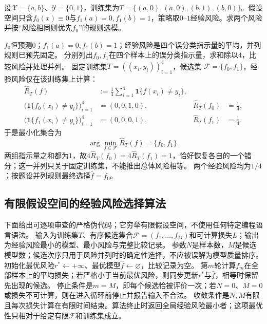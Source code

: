\begin{example}[两个候选分类规则的经验比较]\label{exm:V1-C09-finite-class}\label{schema:V1-C09:CH-18}\label{schema:V1-C09:CH-32}
设$\mathcal X=\{a,b\}$、$\mathcal Y=\{0,1\}$，训练集为$T=\{(a,0),(a,0),(b,1),(b,0)\}$。假设空间只含$f_0(x)\equiv0$与$f_1(a)=0,f_1(b)=1$，策略取$0$--$1$经验风险。求两个风险并按“风险相同则优先$f_0$”的规则选模。
\end{example}
\label{schema:V1-C09:CH-33}
\begin{solution}
\SolGiven $f_0$恒预测$0$；$f_1(a)=0,f_1(b)=1$；经验风险是四个误分类指示量的平均，并列规则已预先固定。
\SolPlan 分别列出$f_0,f_1$在四个样本上的误分类指示量，求和除以$4$，比较风险并处理并列。
\SolDerive
固定训练集$T=((x_i,y_i))_{i=1}^{4}$，候选集
$\mathcal F=\{f_0,f_1\}$，经验风险仅在该训练集上计算：
\[
\begin{aligned}
\widehat R_T(f)
  &:=\frac14\sum_{i=1}^{4}\mathbf 1\{f(x_i)\ne y_i\},\\
\bigl(\mathbf 1\{f_0(x_i)\ne y_i\}\bigr)_{i=1}^{4}
  &=(0,0,1,0),&
\widehat R_T(f_0)&=\frac14,\\
\bigl(\mathbf 1\{f_1(x_i)\ne y_i\}\bigr)_{i=1}^{4}
  &=(0,0,0,1),&
\widehat R_T(f_1)&=\frac14.
\end{aligned}
\]
于是最小化集合为
\[
\arg\min_{f\in\mathcal F}\widehat R_T(f)=\{f_0,f_1\}.
\]
\SolCheck 两组指示量之和都为$1$，故$4\widehat R_T(f_0)=4\widehat R_T(f_1)=1$，恰好恢复各自的一个错分；这一并列只关于固定训练集，不能推出总体风险相等。
\SolAnswer 两个经验风险均为$1/4$；按题设并列规则最终选择$\widehat f=f_0$。
\end{solution}

\subsection*{有限假设空间的经验风险选择算法}
\label{schema:V1-C09:CH-19}
下面给出可逐项审查的严格伪代码；它穷举有限假设空间，不使用任何特定编程语言语法。
\label{schema:V1-C09:CH-20}
输入为训练集$T$、有序候选集合$\mathcal F=(f_1,\ldots,f_M)$和可计算损失$L$；输出为经验风险最小的模型、最小风险与完整比较记录。
\label{schema:V1-C09:CH-21}
参数$N$是样本数，$M$是候选模型数；候选次序只用于风险并列时的确定性选择，不应被误解为模型质量排序。
\label{schema:V1-C09:CH-22}
初始化最优风险$r^*\leftarrow+\infty$、最优模型$\widehat f\leftarrow\varnothing$，比较记录为空。
\label{schema:V1-C09:CH-23}
第$m$轮计算$f_m$在全部样本上的平均损失；若严格小于当前最优风险，则同步更新$r^*$与$\widehat f$，相等时保留先出现的候选。
\label{schema:V1-C09:CH-24}
停止条件是$m=M$，即每个候选恰被评价一次；若$N=0$、$M=0$或损失不可计算，则在进入循环前停止并报告输入不合法。
\label{schema:V1-C09:CH-25}
收敛条件是$N,M$有限且每次损失计算在有限时间结束。算法终止时返回全局经验风险最小者；这项最优性只相对于给定有限$\mathcal F$和训练集成立。

